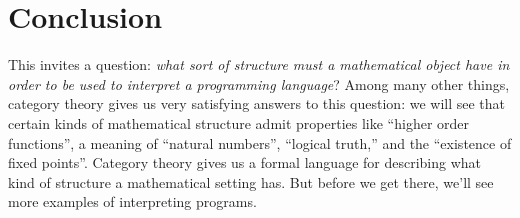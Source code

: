

\section{Conclusion}

This invites a question: \emph{what sort of structure must a mathematical object
have in order to be used to interpret a programming language}?
Among many other things, category theory gives us very satisfying answers to this question:
we will see that certain kinds of mathematical structure admit
properties like ``higher order functions'', a meaning of ``natural numbers'',
 ``logical truth,'' and the ``existence of fixed points''. Category theory gives us a formal language for describing what kind of
structure a mathematical setting has. But before we get there, we'll see
more examples of interpreting programs.

